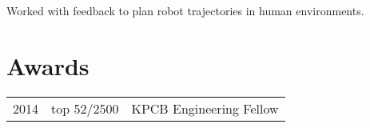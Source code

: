 \documentclass[]{deedy-resume-openfont}
\begin{document}
\begin{minipage}[t]{0.66\textwidth}
Worked with feedback to plan robot trajectories in human environments.
\sectionsep


\section{Awards}

\begin{tabular}{rll}
2014	     & top 52/2500  & KPCB Engineering Fellow\\
\end{tabular}
\sectionsep




%
%

\end{minipage}
\end{document}
